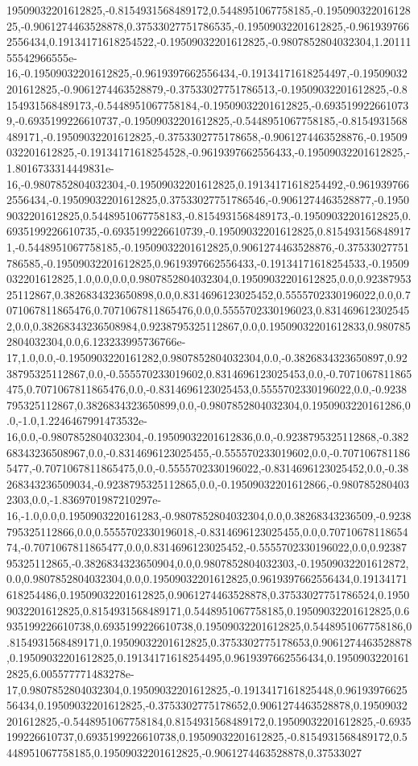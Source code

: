 19509032201612825,-0.8154931568489172,0.5448951067758185,-0.19509032201612825,-0.9061274463528878,0.37533027751786535,-0.19509032201612825,-0.9619397662556434,0.19134171618254522,-0.19509032201612825,-0.9807852804032304,1.2011155542966555e-16,-0.19509032201612825,-0.9619397662556434,-0.19134171618254497,-0.19509032201612825,-0.9061274463528879,-0.37533027751786513,-0.19509032201612825,-0.8154931568489173,-0.5448951067758184,-0.19509032201612825,-0.6935199226610739,-0.6935199226610737,-0.19509032201612825,-0.5448951067758185,-0.8154931568489171,-0.19509032201612825,-0.3753302775178658,-0.9061274463528876,-0.19509032201612825,-0.19134171618254528,-0.9619397662556433,-0.19509032201612825,-1.8016733314449831e-16,-0.9807852804032304,-0.19509032201612825,0.19134171618254492,-0.9619397662556434,-0.19509032201612825,0.37533027751786546,-0.9061274463528877,-0.19509032201612825,0.5448951067758183,-0.8154931568489173,-0.19509032201612825,0.6935199226610735,-0.6935199226610739,-0.19509032201612825,0.8154931568489171,-0.5448951067758185,-0.19509032201612825,0.9061274463528876,-0.37533027751786585,-0.19509032201612825,0.9619397662556433,-0.19134171618254533,-0.19509032201612825,1.0,0.0,0.0,0.9807852804032304,0.19509032201612825,0.0,0.9238795325112867,0.3826834323650898,0.0,0.8314696123025452,0.5555702330196022,0.0,0.7071067811865476,0.7071067811865476,0.0,0.5555702330196023,0.8314696123025452,0.0,0.38268343236508984,0.9238795325112867,0.0,0.19509032201612833,0.9807852804032304,0.0,6.123233995736766e-17,1.0,0.0,-0.1950903220161282,0.9807852804032304,0.0,-0.3826834323650897,0.9238795325112867,0.0,-0.555570233019602,0.8314696123025453,0.0,-0.7071067811865475,0.7071067811865476,0.0,-0.8314696123025453,0.5555702330196022,0.0,-0.9238795325112867,0.3826834323650899,0.0,-0.9807852804032304,0.1950903220161286,0.0,-1.0,1.2246467991473532e-16,0.0,-0.9807852804032304,-0.19509032201612836,0.0,-0.9238795325112868,-0.38268343236508967,0.0,-0.8314696123025455,-0.555570233019602,0.0,-0.7071067811865477,-0.7071067811865475,0.0,-0.5555702330196022,-0.8314696123025452,0.0,-0.38268343236509034,-0.9238795325112865,0.0,-0.19509032201612866,-0.9807852804032303,0.0,-1.8369701987210297e-16,-1.0,0.0,0.1950903220161283,-0.9807852804032304,0.0,0.38268343236509,-0.9238795325112866,0.0,0.5555702330196018,-0.8314696123025455,0.0,0.7071067811865474,-0.7071067811865477,0.0,0.8314696123025452,-0.5555702330196022,0.0,0.9238795325112865,-0.3826834323650904,0.0,0.9807852804032303,-0.19509032201612872,0.0,0.9807852804032304,0.0,0.19509032201612825,0.9619397662556434,0.19134171618254486,0.19509032201612825,0.9061274463528878,0.37533027751786524,0.19509032201612825,0.8154931568489171,0.5448951067758185,0.19509032201612825,0.6935199226610738,0.6935199226610738,0.19509032201612825,0.5448951067758186,0.8154931568489171,0.19509032201612825,0.3753302775178653,0.9061274463528878,0.19509032201612825,0.19134171618254495,0.9619397662556434,0.19509032201612825,6.005577771483278e-17,0.9807852804032304,0.19509032201612825,-0.1913417161825448,0.9619397662556434,0.19509032201612825,-0.3753302775178652,0.9061274463528878,0.19509032201612825,-0.5448951067758184,0.8154931568489172,0.19509032201612825,-0.6935199226610737,0.6935199226610738,0.19509032201612825,-0.8154931568489172,0.5448951067758185,0.19509032201612825,-0.9061274463528878,0.37533027